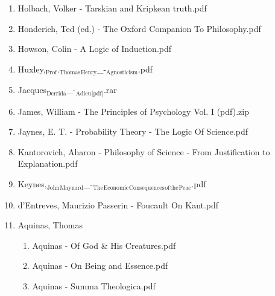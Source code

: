 \documentclass[11pt]{article}
\begin{document}
\begin{enumerate}
\begin{enumerate}
\begin{enumerate}
\begin{enumerate}
\begin{enumerate}
\begin{enumerate}
\item Holbach, Volker - Tarskian and Kripkean truth.pdf
\label{sec-1-1-1-1-7-3-39-13-19}

\item Honderich, Ted (ed.) - The Oxford Companion To Philosophy.pdf
\label{sec-1-1-1-1-7-3-39-13-20}

\item Howson, Colin - A Logic of Induction.pdf
\label{sec-1-1-1-1-7-3-39-13-21}

\item Huxley,$_{\text{Prof}}$.$_{\text{Thomas}}$$_{\text{Henry}}$\_-$_{\text{Agnosticism}}$.pdf
\label{sec-1-1-1-1-7-3-39-13-22}

\item Jacques$_{\text{Derrida}}$\_-$_{\text{Adieu}}$$_{\text{[pdf]}}$.rar
\label{sec-1-1-1-1-7-3-39-13-23}

\item James, William - The Principles of Psychology Vol. I (pdf).zip
\label{sec-1-1-1-1-7-3-39-13-24}

\item Jaynes, E. T. - Probability Theory - The Logic Of Science.pdf
\label{sec-1-1-1-1-7-3-39-13-25}

\item Kantorovich, Aharon - Philosophy of Science - From Justification to Explanation.pdf
\label{sec-1-1-1-1-7-3-39-13-26}

\item Keynes,$_{\text{John}}$$_{\text{Maynard}}$\_-$_{\text{The}}$$_{\text{Economic}}$$_{\text{Consequences}}$$_{\text{of}}$$_{\text{the}}$$_{\text{Peac}}$.pdf
\label{sec-1-1-1-1-7-3-39-13-27}

\item d'Entreves, Maurizio Passerin - Foucault On Kant.pdf
\label{sec-1-1-1-1-7-3-39-13-28}

\item Aquinas, Thomas
\label{sec-1-1-1-1-7-3-39-13-29}
\begin{enumerate}
\item Aquinas - Of God \& His Creatures.pdf
\label{sec-1-1-1-1-7-3-39-13-29-1}

\item Aquinas - On Being and Essence.pdf
\label{sec-1-1-1-1-7-3-39-13-29-2}

\item Aquinas - Summa Theologica.pdf
\label{sec-1-1-1-1-7-3-39-13-29-3}
\end{enumerate}


\end{enumerate}
\end{enumerate}
\end{enumerate}
\end{enumerate}
\end{enumerate}
\end{enumerate}
\end{document}
